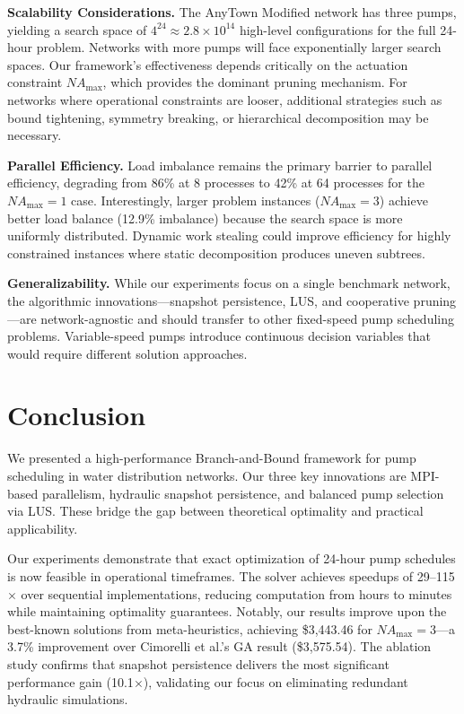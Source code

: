 \documentclass[final,3p,twocolumn]{elsarticle}
\begin{document}
\textbf{Scalability Considerations.} The AnyTown Modified network has three pumps, yielding a search space of $4^{24} \approx 2.8 \times 10^{14}$ high-level configurations for the full 24-hour problem. Networks with more pumps will face exponentially larger search spaces. Our framework's effectiveness depends critically on the actuation constraint $NA_{\max}$, which provides the dominant pruning mechanism. For networks where operational constraints are looser, additional strategies such as bound tightening, symmetry breaking, or hierarchical decomposition may be necessary.

\textbf{Parallel Efficiency.} Load imbalance remains the primary barrier to parallel efficiency, degrading from 86\% at 8 processes to 42\% at 64 processes for the $NA_{\max}=1$ case. Interestingly, larger problem instances ($NA_{\max}=3$) achieve better load balance (12.9\% imbalance) because the search space is more uniformly distributed. Dynamic work stealing could improve efficiency for highly constrained instances where static decomposition produces uneven subtrees.

\textbf{Generalizability.} While our experiments focus on a single benchmark network, the algorithmic innovations---snapshot persistence, LUS, and cooperative pruning---are network-agnostic and should transfer to other fixed-speed pump scheduling problems. Variable-speed pumps introduce continuous decision variables that would require different solution approaches.

\section{Conclusion}

We presented a high-performance Branch-and-Bound framework for pump scheduling in water distribution networks. Our three key innovations are MPI-based parallelism, hydraulic snapshot persistence, and balanced pump selection via LUS. These bridge the gap between theoretical optimality and practical applicability.

Our experiments demonstrate that exact optimization of 24-hour pump schedules is now feasible in operational timeframes. The solver achieves speedups of 29--115$\times$ over sequential implementations, reducing computation from hours to minutes while maintaining optimality guarantees. Notably, our results improve upon the best-known solutions from meta-heuristics, achieving \$3,443.46 for $NA_{\max}=3$---a 3.7\% improvement over Cimorelli et al.'s GA result (\$3,575.54). The ablation study confirms that snapshot persistence delivers the most significant performance gain (10.1$\times$), validating our focus on eliminating redundant hydraulic simulations.
\end{document}

